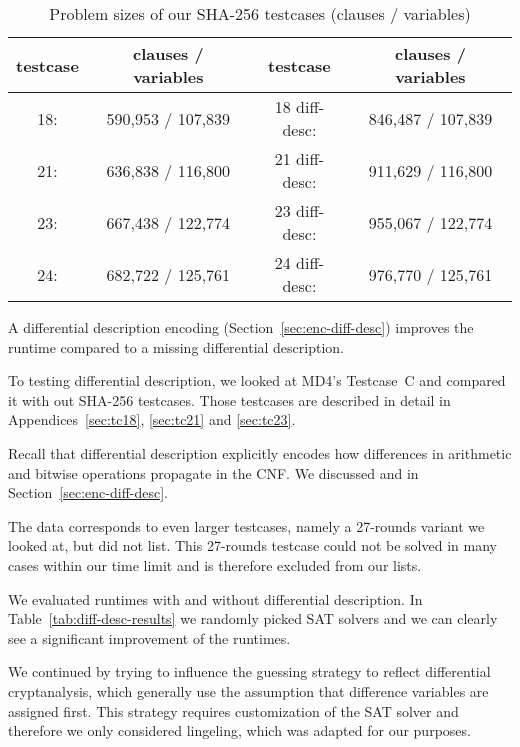 \begin{table}[!h]
  \begin{center}
    \begin{tabular}{cc|cc}
        \textbf{testcase} & \textbf{clauses / variables} & \textbf{testcase} & \textbf{clauses / variables} \\
      \hline
        18: & 590,953 / 107,839 & 18 diff-desc: & 846,487 / 107,839 \\
        21: & 636,838 / 116,800 & 21 diff-desc: & 911,629 / 116,800 \\
        23: & 667,438 / 122,774 & 23 diff-desc: & 955,067 / 122,774 \\
        24: & 682,722 / 125,761 & 24 diff-desc: & 976,770 / 125,761 \\
    \end{tabular}
    \caption{Problem sizes of our SHA-256 testcases (clauses / variables)}
    \label{tab:problem-sizes}
  \end{center}
\end{table}

\begin{prop}
  A differential description encoding (Section~\ref{sec:enc-diff-desc})
  improves the runtime compared to a missing differential description.
\end{prop}

To testing differential description, we looked at MD4's Testcase~C
and compared it with out SHA-256 testcases. Those testcases
are described in detail in Appendices~\ref{sec:tc18}, \ref{sec:tc21}
and \ref{sec:tc23}.

Recall that differential description explicitly encodes
how differences in arithmetic and bitwise operations propagate in the CNF.
We discussed  and  in Section~\ref{sec:enc-diff-desc}.

The data corresponds to even larger testcases, namely a 27-rounds
variant we looked at, but did not list. This 27-rounds testcase
could not be solved in many cases within our time limit and
is therefore excluded from our lists.

We evaluated runtimes with and without differential description.
In Table~\ref{tab:diff-desc-results} we randomly picked SAT solvers
and we can clearly see a significant improvement of the runtimes.

We continued by trying to influence the guessing strategy to reflect
differential cryptanalysis, which generally use the assumption
that difference variables are assigned first. This strategy
requires customization of the SAT solver and therefore we
only considered lingeling, which was adapted for our purposes.

